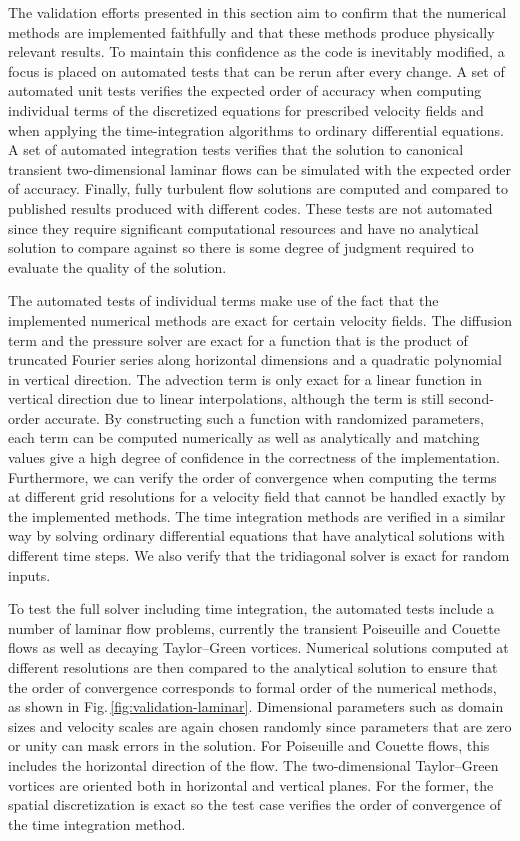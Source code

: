 \documentclass[gmd, manuscript]{copernicus}
\begin{document}
The validation efforts presented in this section aim to confirm that the numerical methods are implemented faithfully and that these methods produce physically relevant results.
To maintain this confidence as the code is inevitably modified, a focus is placed on automated tests that can be rerun after every change.
A set of automated unit tests verifies the expected order of accuracy when computing individual terms of the discretized equations for prescribed velocity fields and when applying the time-integration algorithms to ordinary differential equations.
A set of automated integration tests verifies that the solution to canonical transient two-dimensional laminar flows can be simulated with the expected order of accuracy.
Finally, fully turbulent flow solutions are computed and compared to published results produced with different codes.
These tests are not automated since they require significant computational resources and have no analytical solution to compare against so there is some degree of judgment required to evaluate the quality of the solution.

The automated tests of individual terms make use of the fact that the implemented numerical methods are exact for certain velocity fields.
The diffusion term and the pressure solver are exact for a function that is the product of truncated Fourier series along horizontal dimensions and a quadratic polynomial in vertical direction.
The advection term is only exact for a linear function in vertical direction due to linear interpolations, although the term is still second-order accurate.
By constructing such a function with randomized parameters, each term can be computed numerically as well as analytically and matching values give a high degree of confidence in the correctness of the implementation.
Furthermore, we can verify the order of convergence when computing the terms at different grid resolutions for a velocity field that cannot be handled exactly by the implemented methods.
The time integration methods are verified in a similar way by solving ordinary differential equations that have analytical solutions with different time steps.
We also verify that the tridiagonal solver is exact for random inputs.

To test the full solver including time integration, the automated tests include a number of laminar flow problems, currently the transient Poiseuille and Couette flows as well as decaying Taylor--Green vortices.
Numerical solutions computed at different resolutions are then compared to the analytical solution to ensure that the order of convergence corresponds to formal order of the numerical methods, as shown in Fig.\,\ref{fig:validation-laminar}.
Dimensional parameters such as domain sizes and velocity scales are again chosen randomly since parameters that are zero or unity can mask errors in the solution.
For Poiseuille and Couette flows, this includes the horizontal direction of the flow.
The two-dimensional Taylor--Green vortices are oriented both in horizontal and vertical planes.
For the former, the spatial discretization is exact so the test case verifies the order of convergence of the time integration method.
\end{document}
